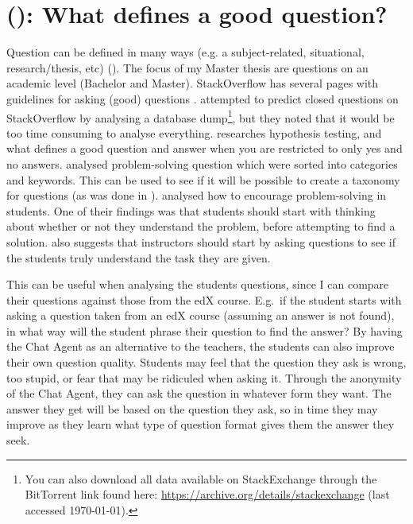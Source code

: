 \section{ (): What defines a good question?}
\label{chapter3:define_good_question}
Question can be defined in many ways (e.g. a subject-related, situational, research/thesis, etc) (\citet[p.~3]{Boyer2010}). The focus of my Master thesis are questions on an 
academic level (Bachelor and Master). StackOverflow has several pages with guidelines for asking (good) questions 
 \cite{Stackoverflow.com2015,CommunityWiki2015,Stackoverflow.com2015a,Stackoverflow.com2015b,Stackoverflow.com2015c}. 
 \vspace{0.5em}\newline
\citet{Lezina2013} attempted to predict closed questions on StackOverflow by analysing a database dump\footnote{You can also download all data available on StackExchange through 
	the BitTorrent link found here: \url{https://archive.org/details/stackexchange} (last accessed \today).}, but they noted that it would be too time consuming to analyse 
everything. \citet{Slowiaczek1992} researches hypothesis testing, and what defines a good question and answer when you are restricted to only yes and no answers.
\vspace{0.5em}\newline
\citet{Ragonis2013} analysed problem-solving question which were sorted into categories and keywords. This can be used to see if it will be possible to create a taxonomy for 
questions (as was done in \citet{Nielsen2008}). \citet{Boyer2010} analysed how to encourage problem-solving in students. One of their findings was that students should start with 
thinking about whether or not they understand the problem, before attempting to find a solution. \citet{Boyer2010} also suggests that instructors should start by asking 
questions to see if the students truly understand the task they are given. 

This can be useful when analysing the students questions, since I can compare their questions against those from the edX course. E.g.~if the student starts with asking a question 
taken from an edX course (assuming an answer is not found), in what way will the student phrase their question to find the answer? 
\vspace{0.5em}\newline
By having the Chat Agent as an alternative to the teachers, the students can also improve their own question quality. Students may feel that the question they ask is wrong, too 
stupid, or fear that may be ridiculed when asking it. Through the anonymity of the Chat Agent, they can ask the question in whatever form they want. The answer they get will be 
based on the question they ask, so in time they may improve as they learn what type of question format gives them the answer they seek. 

\begin{comment}
I would argue that there are many different types of question. 
There are structured queries, where can be object, which query to longer to process. 
The next layer is information gathering questions. Questions designed to get information.
\end{comment}

